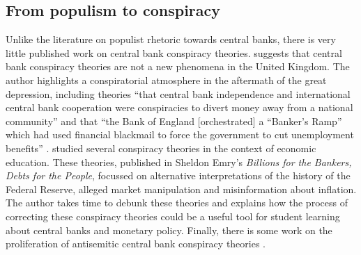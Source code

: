 \documentclass[11pt]{article}
\begin{document}
\subsection{From populism to conspiracy} \label{subsection: From populism to conspiracy}

Unlike the literature on populist rhetoric towards central banks, there is very little published work on central bank conspiracy theories. \cite{james2010central} suggests that central bank conspiracy theories are not a new phenomena in the United Kingdom. The author highlights a conspiratorial atmosphere in the aftermath of the great depression, including theories ``that central bank independence and international central bank cooperation were conspiracies to divert money away from a national community''  and that ``the Bank of England [orchestrated] a “Banker’s Ramp” which had used financial blackmail to force the government to cut unemployment benefits'' \citep[pg.~12]{james2010central}. \cite{tokle2005fed} studied several conspiracy theories in the context of economic education. These theories, published in Sheldon Emry's \textit{Billions for the Bankers, Debts for the People}, focussed on alternative interpretations of the history of the Federal Reserve, alleged market manipulation and misinformation about inflation. The author takes time to debunk these theories and explains how the process of correcting these conspiracy theories could be a useful tool for student learning about central banks and monetary policy. Finally, there is some work on the proliferation of antisemitic central bank conspiracy theories \citep[for example]{league2017jewish}.
\end{document}
